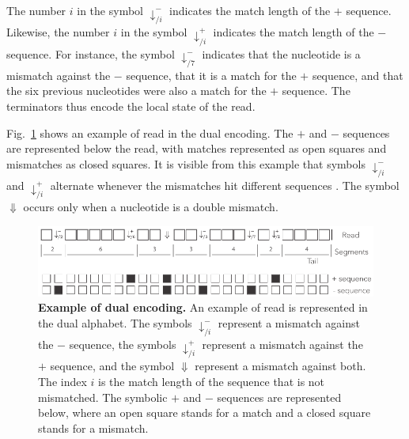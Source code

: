 \documentclass{article}
\begin{document}
The number $i$ in the symbol $\downarrow_{/i}^-$ indicates the match
length of the $+$ sequence. Likewise, the number $i$ in the symbol
$\downarrow_{/i}^+$ indicates the match length of the $-$ sequence. For
instance, the symbol $\downarrow_{/7}^-$ indicates that the nucleotide is a
mismatch against the $-$ sequence, that it is a match for the $+$
sequence, and that the six previous nucleotides were also a match for the
$+$ sequence. The terminators thus encode the local state of the read.

Fig.~\ref{fig:dual} shows an example of read in the dual encoding. The $+$
and $-$ sequences are represented below the read, with matches represented
as open squares and mismatches as closed squares. It is visible from this
example that symbols $\downarrow^-_{/i}$ and $\downarrow^+_{/i}$ alternate
whenever the mismatches hit different sequences . The symbol $\Downarrow$
occurs only when a nucleotide is a double mismatch.

\begin{figure}[h]
\centering
\includegraphics[scale=0.85]{sketch_dual.pdf}
\caption{\textbf{Example of dual encoding.}
An example of read is represented in the dual alphabet. The symbols
$\downarrow_{/i}^-$ represent a mismatch against the $-$ sequence, the
symbols $\downarrow_{/i}^+$ represent a mismatch against the $+$ sequence,
and the symbol $\Downarrow$ represent a mismatch against both. The index
$i$ is the match length of the sequence that is not mismatched. The
symbolic $+$ and $-$ sequences are represented below, where an open square
stands for a match and a closed square stands for a mismatch.}
\label{fig:dual}
\end{figure}
\end{document}
